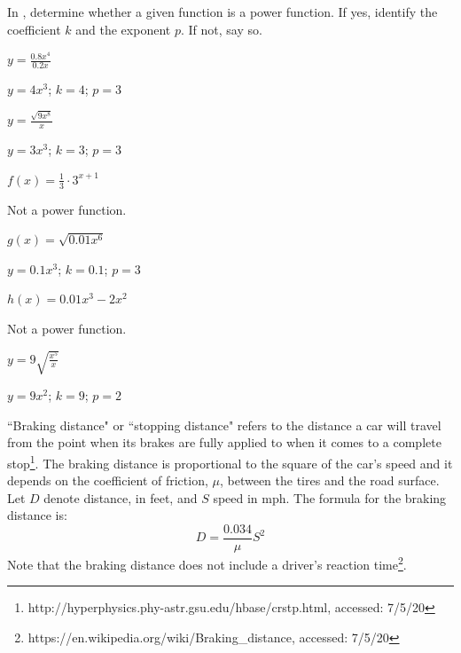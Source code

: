 

In , determine whether a given function is a power function. If yes, identify the coefficient $k$ and the exponent $p$. If not, say so.


\begin{exercise}\label{exercise-4.3.1}
$\displaystyle y= \frac{0.8x^4}{0.2x}$
\end{exercise}

\begin{solution}
$y=4x^3$; $k=4$; $p=3$
\end{solution}

\begin{exercise}
$\displaystyle y=\frac{\sqrt{9x^8}}{x}$
\end{exercise}

\begin{solution}
$y=3x^3$; $k=3$; $p=3$
\end{solution}

\begin{exercise}
$\displaystyle f(x)=\frac{1}{3}\cdot 3^{x+1}$
\end{exercise}

\begin{solution}
Not a power function.
\end{solution}

\begin{exercise}
$\displaystyle g(x)=\sqrt{0.01x^6}$
\end{exercise}

\begin{solution}
$y=0.1x^3$; $k=0.1$; $p=3$
\end{solution}

\begin{exercise}
$\displaystyle h(x)=0.01x^3-2x^2$
\end{exercise}

\begin{solution}
Not a power function.
\end{solution}

\begin{exercise}\label{exercise-4.3.6}
$\displaystyle y=9\sqrt{\frac{x^5}{x}}$
\end{exercise}

\begin{solution}
$y=9x^2$; $k=9$; $p=2$
\end{solution}





``Braking distance" or ``stopping distance" refers to the distance a car will travel from the point when its brakes are fully applied to when it comes to a complete stop\footnote{http://hyperphysics.phy-astr.gsu.edu/hbase/crstp.html, accessed: 7/5/20}.  The braking distance is proportional to the square of the car's speed and it depends on the coefficient of friction, $\mu$, between the tires and the road surface. Let $D$ denote distance, in feet, and $S$ speed in mph. The formula for the braking distance is:
\[
D=\frac{0.034}{\mu}S^2
\]
Note that the braking distance does not include a driver's reaction time\footnote{https://en.wikipedia.org/wiki/Braking\_distance, accessed: 7/5/20}.

